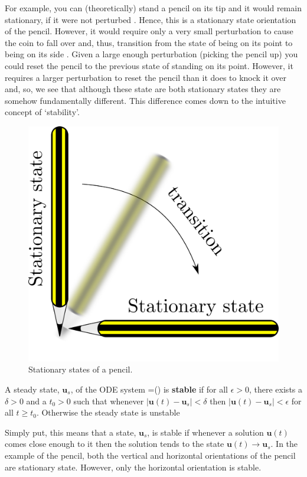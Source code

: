 For example, you can (theoretically) stand a pencil on its tip and it would remain stationary, if it were not perturbed . Hence, this is a stationary state orientation of the pencil. However, it would require only a very small perturbation to cause the coin to fall over and, thus, transition from the state of being on its point to being on its side . Given a large enough perturbation (\ie picking the pencil up) you could reset the pencil to the previous state of standing on its point. However, it requires a larger perturbation to reset the pencil than it does to knock it over and, so, we see that although these state are both stationary states they are somehow fundamentally different. This difference comes down to the intuitive concept of `stability'.
\begin{figure}[!!!h!!!tb]
\centering
\includegraphics[width=\ttp]{../Pictures/Pencil_stationary_state.png}
\caption{\label{Pencil_stationary_state} Stationary states of a pencil.}
\end{figure}

\begin{defin}
A steady state, $\bm{u}_s$, of the ODE system
\bb
{}=()
\ee
is \textbf{stable} if for all $\epsilon >0$, there exists a $\delta > 0$ and a $t_0>0$ such that whenever $|\bm{u}(t)-\bm{u}_s|< \delta$ then $|\bm{u}(t)-\bm{u}_s|<\epsilon$ for all $t \ge t_0$. Otherwise the steady state is unstable
\end{defin}
Simply put, this means that a state, $\bm{u}_s$, is stable if whenever a solution $\bm{u}(t)$ comes close enough to it then the solution tends to the state \ie $\bm{u}(t)\rightarrow\bm{u}_s$. In the example of the pencil, both the vertical and horizontal orientations of the pencil are stationary state. However, only the horizontal orientation is stable.

